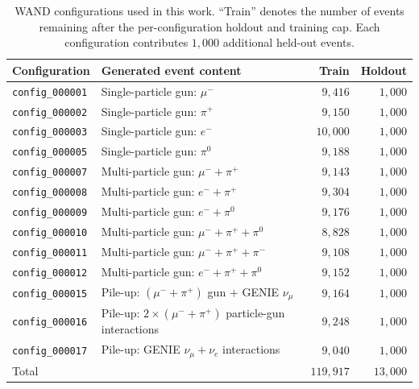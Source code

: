   \begin{table}[t]
      \centering
      \caption{
          WAND configurations used in this work. ``Train'' denotes the number of
          events remaining after the per-configuration holdout and training cap.
          Each configuration contributes \(1{,}000\) additional held-out events.
      }
      \label{tab:wand-configurations}
      \small
      \begin{tabular}{@{}llrr@{}}
          \toprule
          Configuration & Generated event content & Train & Holdout \\
          \midrule
          \texttt{config\_000001}
              & Single-particle gun: \(\mu^-\)
              & \(9{,}416\) & \(1{,}000\) \\
          \texttt{config\_000002}
              & Single-particle gun: \(\pi^+\)
              & \(9{,}150\) & \(1{,}000\) \\
          \texttt{config\_000003}
              & Single-particle gun: \(e^-\)
              & \(10{,}000\) & \(1{,}000\) \\
          \texttt{config\_000005}
              & Single-particle gun: \(\pi^0\)
              & \(9{,}188\) & \(1{,}000\) \\
          \texttt{config\_000007}
              & Multi-particle gun: \(\mu^-+\pi^+\)
              & \(9{,}143\) & \(1{,}000\) \\
          \texttt{config\_000008}
              & Multi-particle gun: \(e^-+\pi^+\)
              & \(9{,}304\) & \(1{,}000\) \\
          \texttt{config\_000009}
              & Multi-particle gun: \(e^-+\pi^0\)
              & \(9{,}176\) & \(1{,}000\) \\
          \texttt{config\_000010}
              & Multi-particle gun: \(\mu^-+\pi^++\pi^0\)
              & \(8{,}828\) & \(1{,}000\) \\
          \texttt{config\_000011}
              & Multi-particle gun: \(\mu^-+\pi^++\pi^-\)
              & \(9{,}108\) & \(1{,}000\) \\
          \texttt{config\_000012}
              & Multi-particle gun: \(e^-+\pi^++\pi^0\)
              & \(9{,}152\) & \(1{,}000\) \\
          \texttt{config\_000015}
              & Pile-up: \((\mu^-+\pi^+)\) gun \(+\)
                \textsc{GENIE} \(\nu_\mu\)
              & \(9{,}164\) & \(1{,}000\) \\
          \texttt{config\_000016}
              & Pile-up: \(2\times(\mu^-+\pi^+)\) particle-gun interactions
              & \(9{,}248\) & \(1{,}000\) \\
          \texttt{config\_000017}
              & Pile-up: \textsc{GENIE} \(\nu_\mu+\nu_e\) interactions
              & \(9{,}040\) & \(1{,}000\) \\
          \midrule
          {Total}
              & & \({119{,}917}\) & \({13{,}000}\) \\
          \bottomrule
      \end{tabular}
  \end{table}

